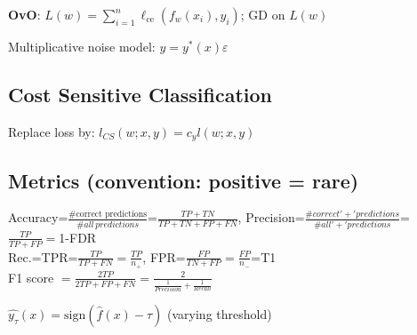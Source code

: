 \textbf{OvO}: \(L(w) = \sum_{i = 1}^n\ell_{\text{ce}}(f_w(x_i), y_i)\); GD on \(L(w)\)

Multiplicative noise model: \(y = y^*(x)\varepsilon\)
\subsection*{Cost Sensitive Classification}
Replace loss by: $l_{CS}(w;x,y) = c_y l(w;x,y)$

\subsection*{Metrics (convention: positive = rare)}
Accuracy=$\frac{\text{\#correct predictions}}{\#all\, predictions}$=$\frac{TP+TN}{TP+TN+FP+FN}$, 
Precision=$\frac{\#correct'+'predictions}{\#all'+'predictions}$=$\frac{TP}{TP+FP}=$1-FDR\\
Rec.=TPR=$\frac{TP}{TP+FN}=\frac{TP}{n_+}$, FPR=$\frac{FP}{TN+FP}=\frac{FP}{n_-}$=T1\\
F1 score $=\frac{2TP}{2TP+FP+FN}=\frac{2}{\frac{1}{Precision}+\frac{1}{Recall}}$

\(\hat{y_\tau}(x) = \text{sign}(\hat{f}(x) - \tau)\) (varying threshold)